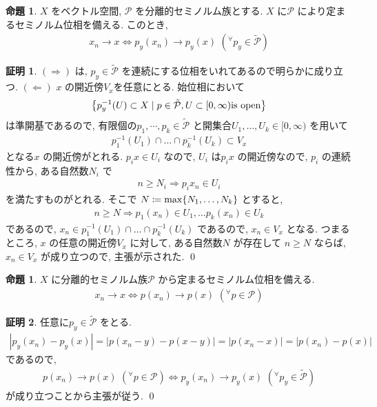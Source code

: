 \documentclass[twocolumn, landscape, a4paper , 8pt, fleqn, titlepage ]{jsarticle}
\theoremstyle{definition}
\newtheorem{prop}[dfn]{命題}
\newtheorem*{pf*}{証明}
\newcommand{\any}{{}^{\forall}}
\newcommand{\cbra}[1]{\mleft\{#1\mright\}}
\newcommand{\abs}[1]{\left|#1\right|}
\newcommand{\LR}{\Leftrightarrow}
\newcommand{\naraba}{\Rightarrow}
\newcommand{\gyaku}{\Leftarrow}
\begin{document}
\begin{prop} $X$ をベクトル空間, $\mathcal P$ を分離的セミノルム族とする. $X$ に$\mathcal P$ により定まるセミノルム位相を備える. このとき, 
\begin{align*} x_n \rightarrow x \LR p_y (x_n) \rightarrow p_y (x) \,\, (\any p_y \in \tilde {\mathcal P} ) \end{align*}
\end{prop}
\begin{pf*}
$(\naraba)$ は, $p_y \in \tilde{\mathcal P}$ を連続にする位相をいれてあるので明らかに成り立つ. $(\gyaku)$ $x$ の開近傍$V_x$を任意にとる. 始位相において
\begin{align*} \cbra{p_y ^{-1}(U) \subset X \mid p \in \tilde{\mathcal P}, U \subset [0, \infty) \textrm{is open}  } \end{align*}
は準開基であるので, 有限個の$p_1, \cdots , p_k \in \tilde{\mathcal P}$ と開集合$U_1, \ldots , U_k \in [0, \infty)$ を用いて
\begin{align*} p_1^{-1}(U_1)\cap \ldots \cap p_k^{-1}(U_k) \subset V_x\end{align*}
となる$x$ の開近傍がとれる. $p_i x \in U_i$ なので, $U_i$ は$p_i x$ の開近傍なので, $p_i$ の連続性から, ある自然数$N_i$ で
\begin{align*} n \geq N_i \naraba p_i x_n \in U_i \end{align*}
を満たすものがとれる. そこで $N \coloneqq \max \cbra{N_1, \ldots , N_k}$ とすると, 
\begin{align*} n \geq N \naraba p_1(x_n) \in U_1, \ldots p_k(x_n) \in U_k \end{align*}
であるので, $x_n \in p_1^{-1}(U_1)\cap \ldots \cap p_k^{-1}(U_k)$ であるので, $x_n \in V_x$ となる. 
つまるところ, $x$ の任意の開近傍$V_x$ に対して, ある自然数$N$ が存在して $n \geq N$ ならば, $x_n \in V_x$ が成り立つので, 主張が示された. 
\qed
\end{pf*}

\begin{prop}$X$ に分離的セミノルム族$\mathcal P$ から定まるセミノルム位相を備える.
\begin{align*} x_n \rightarrow x \LR p(x_n) \rightarrow p(x) \,\, (\any p \in \mathcal P) \end{align*}
\end{prop}
\begin{pf*} 任意に$p_y \in \tilde{\mathcal P}$ をとる.
\begin{align*} \abs{p_y (x_n) - p_y (x)} = \abs{p(x_n -y ) - p(x-y)} = \abs{p (x_n - x)} = \abs{p(x_n) - p(x)}  \end{align*}
であるので, 
\begin{align*} p(x_n) \rightarrow p(x) \,\, (\any p \in \mathcal P) \LR p_y(x_n) \rightarrow p_y(x) \,\, (\any p_y \in \tilde {\mathcal P} )  \end{align*}
が成り立つことから主張が従う.
\qed
\end{pf*}
\end{document}

